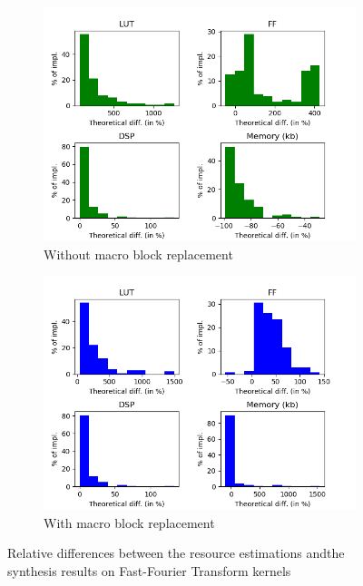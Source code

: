 \begin{figure}[h!]
    \centering
    \begin{subfigure}{1.0\textwidth}
        \centering
        \includegraphics[width=.8\textwidth]{Figures/results/fftRelativeWithoutMacro}
        \caption{Without macro block replacement}
        \label{ch.expe:sec.estimators:ssec.resource:fig.fft:sfig.without}
    \end{subfigure}
    \begin{subfigure}{1.0\textwidth}
        \centering
        \includegraphics[width=.8\textwidth]{Figures/results/fftRelativeWithMacro}
        \caption{With macro block replacement}
        \label{ch.expe:sec.estimators:ssec.resource:fig.fft:sfig.with}
    \end{subfigure}
    \caption[Quality of resource estimation on FFT]{Relative differences between the resource estimations and\newline the synthesis results on Fast-Fourier Transform kernels}
    \label{ch.expe:sec.estimators:ssec.resource:fig.fft}
\end{figure}
\clearpage

